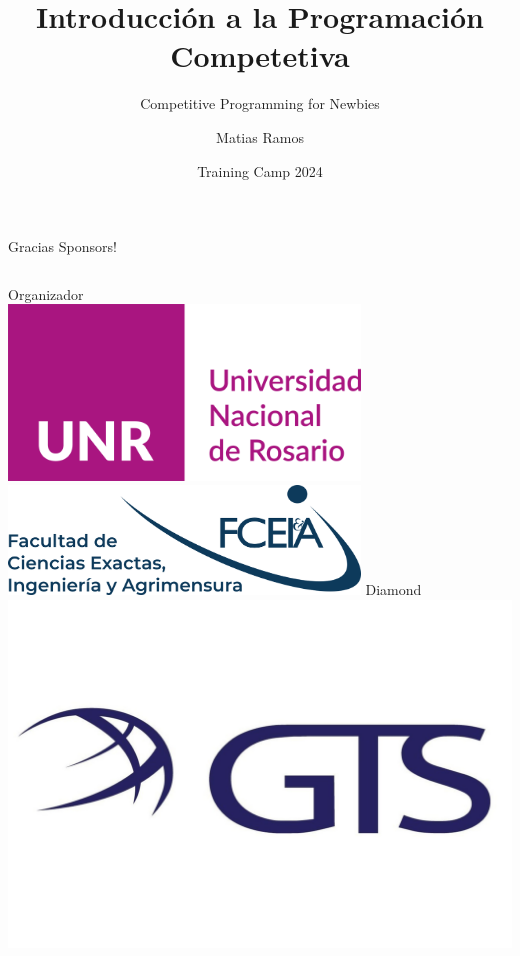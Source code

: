 \documentclass{beamer}
\title %
{Introducción a la Programación Competetiva}
\subtitle{Competitive Programming for Newbies}
\author[Matias Ramos]{Matias Ramos}
\institute[]{Universidad Tecnológica Nacional - Facultad Regional Santa Fe}
\date[TC 2024]{Training Camp 2024}
\begin{document}
\frame{\titlepage}



\begin{frame}{Gracias Sponsors!}
    \begin{columns}[t]
        \centering
        Organizador\\
        \vspace{0.8cm}
        \includegraphics[width=0.7\textwidth,keepaspectratio]{logos/UNRlogo.png}
        \includegraphics[width=0.7\textwidth,keepaspectratio]{logos/FCEIA.png}
        \centering
        Diamond\\
        \includegraphics[width=1\textwidth,keepaspectratio]{logos/GTSlogo.jpeg}

\end{columns}
\end{frame}
\end{document}

